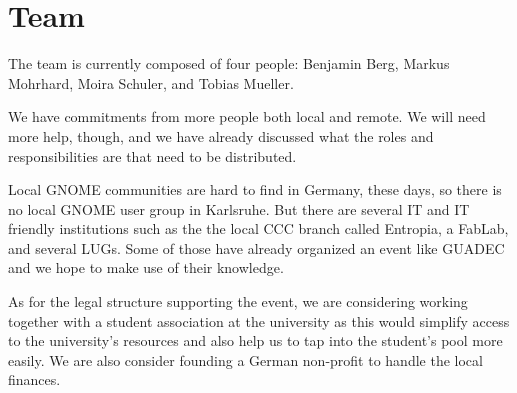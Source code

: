 
\newpage


\vspace*{9.5cm}


\section{Team}

The team is currently composed of four people:
Benjamin Berg, Markus Mohrhard, Moira Schuler, and Tobias Mueller.

We have commitments from more people both local and remote.
We will need more help, though, and we have already discussed
what the roles and responsibilities are that need to be distributed.

Local GNOME communities are hard to find in Germany, these days,
so there is no local GNOME user group in Karlsruhe.
But there are several IT and IT friendly institutions such as the
the local CCC branch called Entropia, a FabLab, and several LUGs.
Some of those have already organized an event like GUADEC and
we hope to make use of their knowledge.

As for the legal structure supporting the event,
we are considering working together with a student association at the
university as this would simplify access to the university's resources
and also help us to tap into the student's pool more easily.
We are also consider founding a German non-profit to handle the
local finances.
